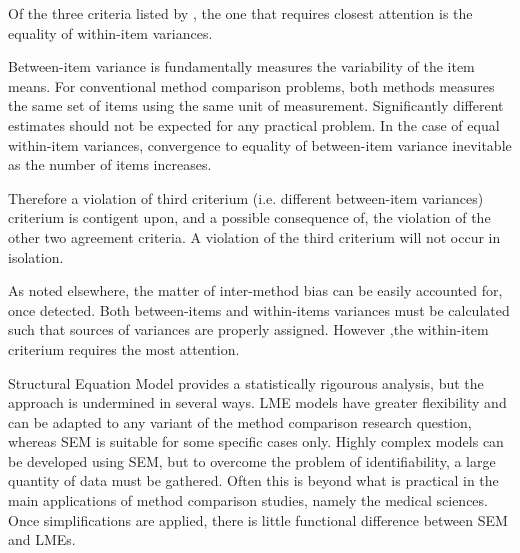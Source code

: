 Of the three criteria listed by \citet{barnhart}, the one that requires closest attention is the equality of within-item variances.


Between-item variance is fundamentally measures the variability of the item means. For conventional method comparison problems, 
both methods measures the same set of items using the same unit of measurement. Significantly different estimates should not be expected for any practical problem. 
In the case of equal within-item variances, convergence to equality of between-item variance inevitable as the number of items increases. 

Therefore a violation of third criterium (i.e. different between-item variances) criterium is contigent upon, and a  
possible consequence of, the violation of the other two agreement criteria. A violation of the third criterium will not occur in isolation.


As noted elsewhere, the matter of inter-method bias can be easily accounted for, once detected. Both between-items and within-items variances must be calculated such that sources of variances are properly assigned.
However ,the within-item criterium requires the most attention. 




Structural Equation Model provides a statistically rigourous analysis, but the approach is undermined in several ways.
LME models have greater flexibility and can be adapted to any variant of the method comparison research question, whereas 
SEM is suitable for some specific cases only. Highly complex models can be developed using SEM, but to overcome the problem of identifiability, a large quantity of data must be gathered.
Often this is beyond what is practical in the main applications of method comparison studies, namely the medical sciences. Once simplifications are applied, there is little functional difference between SEM and LMEs.

